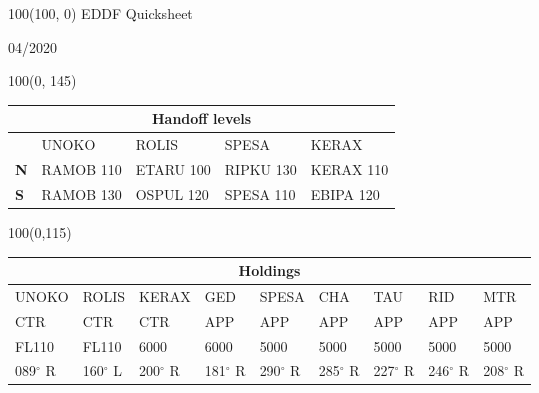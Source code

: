\documentclass[10pt,landscape,a4paper]{article}
\begin{document}
\begin{textblock}{100}(100, 0)
  \large
  \centering
  EDDF Quicksheet

  04/2020
\end{textblock}

\begin{textblock}{100}(0, 145)
\begin{table}[]
\begin{tabular}{|l|l|l|l|l|}
\multicolumn{5}{c}{\textbf{Handoff levels}}              \\ \hline
           & UNOKO     & ROLIS     & SPESA     & KERAX     \\ \hline
\textbf{N} & RAMOB 110 & ETARU 100 & RIPKU 130 & KERAX 110 \\
\textbf{S} & RAMOB 130 & OSPUL 120 & SPESA 110 & EBIPA 120 \\ \hline
\end{tabular}
\end{table}
\end{textblock}

\begin{textblock}{100}(0,115)
\begin{table}[]
\begin{tabular}{|l|l|l|l|l|l|l|l|l|}

\multicolumn{9}{c}{\textbf{Holdings}}                                        \\ \hline
UNOKO  & ROLIS  & KERAX  & GED    & SPESA  & CHA    & TAU    & RID    & MTR    \\ \hline
CTR    & CTR    & CTR    & APP    & APP    & APP    & APP    & APP    & APP    \\
FL110  & FL110  & 6000   & 6000   & 5000   & 5000   & 5000   & 5000   & 5000   \\
089$^\circ$ R & 160$^\circ$ L & 200$^\circ$ R & 181$^\circ$ R & 290$^\circ$ R & 285$^\circ$ R & 227$^\circ$ R & 246$^\circ$ R & 208$^\circ$ R \\ \hline
\end{tabular}
\end{table}
\end{textblock}
\end{document}
